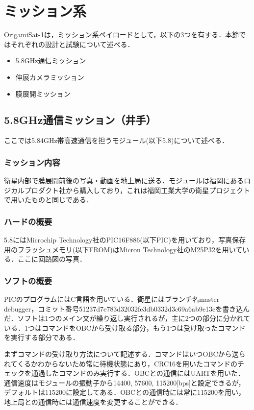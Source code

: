 \section{ミッション系}

OrigamiSat-1は，ミッション系ペイロードとして，以下の3つを有する．本節ではそれぞれの設計と試験について述べる．
\begin{itemize}
	\item 5.8GHz通信ミッション
	\item 伸展カメラミッション
	\item 膜展開ミッション
\end{itemize}

\subsection{5.8GHz通信ミッション（井手）}
ここでは5.84GHz帯高速通信を担うモジュール(以下5.8)について述べる．
\subsubsection{ミッション内容}
衛星内部で膜展開前後の写真・動画を地上局に送る．モジュールは福岡にあるロジカルプロダクト社から購入しており，これは福岡工業大学の衛星プロジェクトで用いたものと同じである．

\subsubsection{ハードの概要}
5.8にはMicrochip Technology社のPIC16F886(以下PIC)を用いており，写真保存用のフラッシュメモリ(以下FROM)はMicron Technology社のM25P32を用いている．ここに回路図の写真．

\subsubsection{ソフトの概要}
PICのプログラムにはC言語を用いている．衛星にはブランチ名master-debugger，コミット番号51237d7e783d32032fe3db0332d3c69a6ab9e13eを書き込んだ．ソフトは1つのメイン文が繰り返し実行されるが，主に2つの部分に分かれている．1つはコマンドをOBCから受け取る部分，もう1つは受け取ったコマンドを実行する部分である．

まずコマンドの受け取り方法について記述する．コマンドはいつOBCから送られてくるかわからないため常に待機状態にあり，CRC16を用いたコマンドのチェックを通過したコマンドのみ実行する．OBCとの通信にはUARTを用いた．通信速度はモジュールの振動子から14400, 57600, 115200[bps]と設定できるが，デフォルトは115200に設定してある．OBCとの通信時には常に115200を用い，地上局との通信時には通信速度を変更することができる．